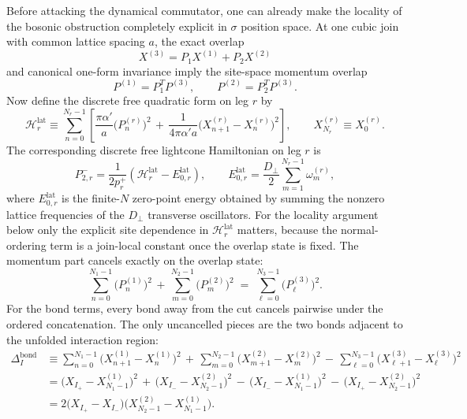\documentclass[11pt]{article}
\numberwithin{equation}{section}
\newcommand{\perpD}{D_\perp}
\begin{document}
Before attacking the dynamical commutator, one can already make the locality of the bosonic obstruction completely explicit in $\sigma$ position space. At one cubic join with common lattice spacing $a$, the exact overlap
\[
X^{(3)}=P_1X^{(1)}+P_2X^{(2)}
\]
and canonical one-form invariance imply the site-space momentum overlap
\begin{equation}
\label{eq:s12-003}
P^{(1)}=P_1^T P^{(3)},
\qquad
P^{(2)}=P_2^T P^{(3)}.
\end{equation}
Now define the discrete free quadratic form on leg $r$ by
\begin{equation}
\label{eq:s12-004}
\mathcal H_r^{\mathrm{lat}}
\equiv
\sum_{n=0}^{N_r-1}
\left[
\frac{\pi\alpha'}{a}\bigl(P_n^{(r)}\bigr)^2
\,+\,
\frac{1}{4\pi\alpha' a}\bigl(X_{n+1}^{(r)}-X_n^{(r)}\bigr)^2
\right],
\qquad
X_{N_r}^{(r)}\equiv X_0^{(r)}.
\end{equation}
The corresponding discrete free lightcone Hamiltonian on leg $r$ is
\begin{equation}
\label{eq:s12-005}
P^-_{2,r}
=
\frac{1}{2p_r^+}\left(\mathcal H_r^{\mathrm{lat}}-E_{0,r}^{\mathrm{lat}}\right),
\qquad
E_{0,r}^{\mathrm{lat}}
=
\frac{\perpD}{2}\sum_{m=1}^{N_r-1}\omega_m^{(r)},
\end{equation}
where $E_{0,r}^{\mathrm{lat}}$ is the finite-$N$ zero-point energy obtained by summing the nonzero lattice frequencies of the $D_\perp$ transverse oscillators. For the locality argument below only the explicit site dependence in $\mathcal H_r^{\mathrm{lat}}$ matters, because the normal-ordering term is a join-local constant once the overlap state is fixed. The momentum part cancels exactly on the overlap state:
\begin{equation}
\label{eq:s12-006}
\sum_{n=0}^{N_1-1}\bigl(P_n^{(1)}\bigr)^2
\,+\,
\sum_{m=0}^{N_2-1}\bigl(P_m^{(2)}\bigr)^2
\;=\;
\sum_{\ell=0}^{N_3-1}\bigl(P_\ell^{(3)}\bigr)^2.
\end{equation}
For the bond terms, every bond away from the cut cancels pairwise under the ordered concatenation. The only uncancelled pieces are the two bonds adjacent to the unfolded interaction region:
\begin{equation}
\label{eq:s12-007}
\begin{aligned}
\Delta_I^{\mathrm{bond}}
&\equiv
\sum_{n=0}^{N_1-1}\bigl(X_{n+1}^{(1)}-X_n^{(1)}\bigr)^2
\,+\,
\sum_{m=0}^{N_2-1}\bigl(X_{m+1}^{(2)}-X_m^{(2)}\bigr)^2
\,-\,
\sum_{\ell=0}^{N_3-1}\bigl(X_{\ell+1}^{(3)}-X_\ell^{(3)}\bigr)^2\\
&=
\bigl(X_{I_+}-X_{N_1-1}^{(1)}\bigr)^2
\,+\,
\bigl(X_{I_-}-X_{N_2-1}^{(2)}\bigr)^2
\,-\,
\bigl(X_{I_-}-X_{N_1-1}^{(1)}\bigr)^2
\,-\,
\bigl(X_{I_+}-X_{N_2-1}^{(2)}\bigr)^2\\
&=
2\bigl(X_{I_+}-X_{I_-}\bigr)
\bigl(X_{N_2-1}^{(2)}-X_{N_1-1}^{(1)}\bigr).
\end{aligned}
\end{equation}
\end{document}
